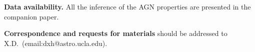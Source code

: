 \documentclass{natureprintstyle}
\begin{document}
\textbf{Data availability.} All the inference of the AGN properties are presented in the companion paper.

\textbf{Correspondence and requests for materials} should be addressed to X.D.~(email:dxh@astro.ucla.edu).



%
%
\end{document}
